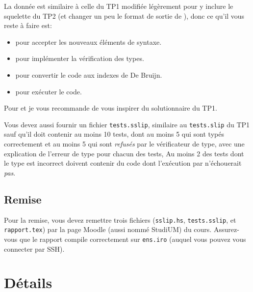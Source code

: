 \documentclass{article}
\begin{document}
La donnée est similaire à celle du TP1 modifiée légèrement pour
y inclure le squelette du TP2 (et changer un peu le format de sortie de
), donc ce qu'il vous reste à faire est:
\begin{itemize}
\item {} pour accepter les nouveaux éléments de syntaxe.
\item {} pour implémenter la vérification des types.
\item {} pour convertir le code aux indexes de De Bruijn.
\item {} pour exécuter le code.
\end{itemize}
Pour  et  je vous recommande de vous inspirer du
solutionnaire du TP1.

Vous devez aussi fournir un fichier \texttt{tests.sslip}, similaire au
\texttt{tests.slip} du TP1 sauf qu'il doit contenir au moins 10 tests, dont
au moins 5 qui sont typés correctement et au moins 5 qui sont \emph{refusés}
par le vérificateur de type, avec une explication de l'erreur de type pour
chacun des tests, Au moins 2 des tests dont le type est incorrect doivent
contenir du code dont l'exécution par  n'échouerait \emph{pas}.

\subsection{Remise}

Pour la remise, vous devez remettre trois fichiers (\texttt{sslip.hs},
\texttt{tests.sslip}, et \texttt{rapport.tex}) par la
page Moodle (aussi nommé StudiUM) du cours.  Assurez-vous que le rapport
compile correctement sur \texttt{ens.iro} (auquel vous pouvez vous connecter
par SSH).

\section{Détails}
\end{document}
